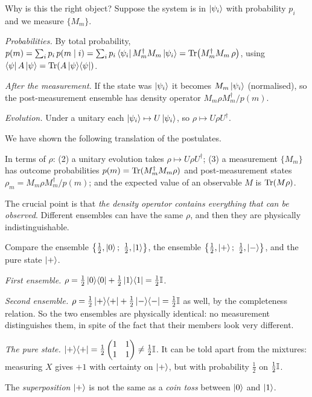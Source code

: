 Why is this the right object? Suppose the system is in $\left|\psi_i\right\rangle$ with probability $p_i$ and we measure $\{M_m\}$.
\begin{steps}
  \item \emph{Probabilities.} By total probability, $p(m)=\sum_ip_i\,p(m\mid i)=\sum_ip_i\left\langle\psi_i\right|M_m^\dagger M_m\left|\psi_i\right\rangle=\operatorname{Tr}\bigl(M_m^\dagger M_m\,\rho\bigr)$, using $\left\langle\psi\right| A\left|\psi\right\rangle=\operatorname{Tr}(A\left|\psi\right\rangle\!\left\langle\psi\right|)$.
  \item \emph{After the measurement.} If the state was $\left|\psi_i\right\rangle$ it becomes $M_m\left|\psi_i\right\rangle$ (normalised), so the post-measurement ensemble has density operator $M_m\rho M_m^\dagger/p(m)$.
  \item \emph{Evolution.} Under a unitary each $\left|\psi_i\right\rangle\mapsto U\left|\psi_i\right\rangle$, so $\rho\mapsto U\rho U^\dagger$.
\end{steps}
We have shown the following translation of the postulates.

\begin{proposition}\label{prop:postulates-rho}
  In terms of $\rho$: (2) a unitary evolution takes $\rho\mapsto U\rho U^\dagger$; (3) a measurement $\{M_m\}$ has outcome probabilities $p(m)=\operatorname{Tr}(M_m^\dagger M_m\rho)$ and post-measurement states $\rho_m=M_m\rho M_m^\dagger/p(m)$; and the expected value of an observable $M$ is $\operatorname{Tr}(M\rho)$.
\end{proposition}

The crucial point is that \emph{the density operator contains everything that can be observed}. Different ensembles can have the same $\rho$, and then they are physically indistinguishable.

\begin{example}\label{ex:mixed-vs-superposition}
  Compare the ensemble $\bigl\{\tfrac12,\ket0;\ \tfrac12,\ket1\bigr\}$, the ensemble $\bigl\{\tfrac12,\ket+;\ \tfrac12,\ket-\bigr\}$, and the pure state $\left|+\right\rangle$.
\end{example}
\begin{solution}
  \begin{steps}
    \item \emph{First ensemble.} $\rho=\tfrac12\left|0\right\rangle\!\left\langle0\right|+\tfrac12\left|1\right\rangle\!\left\langle1\right|=\tfrac12\mathbb{I}$.
    \item \emph{Second ensemble.} $\rho=\tfrac12\left|+\right\rangle\!\left\langle+\right|+\tfrac12\left|-\right\rangle\!\left\langle-\right|=\tfrac12\mathbb{I}$ as well, by the completeness relation. So the two ensembles are physically identical: no measurement distinguishes them, in spite of the fact that their members look very different.
    \item \emph{The pure state.} $\left|+\right\rangle\!\left\langle+\right|=\tfrac12\begin{pmatrix}1&1\\1&1\end{pmatrix}\neq\tfrac12\mathbb{I}$. It can be told apart from the mixtures: measuring $X$ gives $+1$ with certainty on $\left|+\right\rangle$, but with probability $\tfrac12$ on $\tfrac12\mathbb{I}$.
  \end{steps}
  The \emph{superposition} $\left|+\right\rangle$ is not the same as a \emph{coin toss} between $\left|0\right\rangle$ and $\left|1\right\rangle$.
\end{solution}


